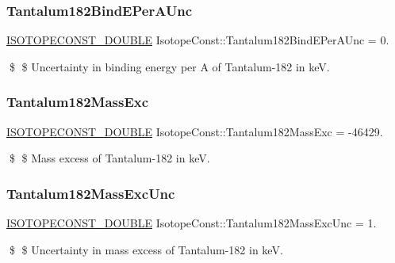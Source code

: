\subsubsection{\texorpdfstring{Tantalum182\+Bind\+E\+Per\+A\+Unc}{Tantalum182BindEPerAUnc}}
{\footnotesize\ttfamily \mbox{\hyperlink{group___isotope_const-_macros_ga8f45a7272ce02c0b4c65c44636ed719a}{I\+S\+O\+T\+O\+P\+E\+C\+O\+N\+S\+T\+\_\+\+D\+O\+U\+B\+LE}} Isotope\+Const\+::\+Tantalum182\+Bind\+E\+Per\+A\+Unc = 0.}

\$ \$ Uncertainty in binding energy per A of Tantalum-\/182 in keV. \mbox{\label{group___isotope_const-_tantalum-_ta182_ga7dd4f7be7b92a9ee1ddfcd1a14399eb5}} 
\subsubsection{\texorpdfstring{Tantalum182\+Mass\+Exc}{Tantalum182MassExc}}
{\footnotesize\ttfamily \mbox{\hyperlink{group___isotope_const-_macros_ga8f45a7272ce02c0b4c65c44636ed719a}{I\+S\+O\+T\+O\+P\+E\+C\+O\+N\+S\+T\+\_\+\+D\+O\+U\+B\+LE}} Isotope\+Const\+::\+Tantalum182\+Mass\+Exc = -\/46429.}

\$ \$ Mass excess of Tantalum-\/182 in keV. \mbox{\label{group___isotope_const-_tantalum-_ta182_gaaffa88125e444b9600ae8664a9a40158}} 
\subsubsection{\texorpdfstring{Tantalum182\+Mass\+Exc\+Unc}{Tantalum182MassExcUnc}}
{\footnotesize\ttfamily \mbox{\hyperlink{group___isotope_const-_macros_ga8f45a7272ce02c0b4c65c44636ed719a}{I\+S\+O\+T\+O\+P\+E\+C\+O\+N\+S\+T\+\_\+\+D\+O\+U\+B\+LE}} Isotope\+Const\+::\+Tantalum182\+Mass\+Exc\+Unc = 1.}

\$ \$ Uncertainty in mass excess of Tantalum-\/182 in keV. \mbox{\label{group___isotope_const-_tantalum-_ta182_gaf861b6da2846ece0212731f23782c48a}} 
